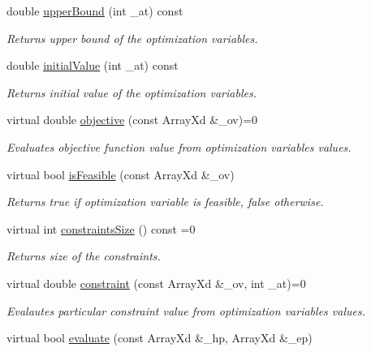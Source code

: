 \begin{DoxyCompactItemize}
double \hyperlink{class_c_optimization_problem_a389f3d72ef773631e96d42b152d2bb2e}{upper\-Bound} (int \-\_\-at) const 
\begin{DoxyCompactList}\small\item\em Returns upper bound of the optimization variables. \end{DoxyCompactList}\item 
double \hyperlink{class_c_optimization_problem_ae1fc23613ecf4730353102bf9132fddb}{initial\-Value} (int \-\_\-at) const 
\begin{DoxyCompactList}\small\item\em Returns initial value of the optimization variables. \end{DoxyCompactList}\item 
virtual double \hyperlink{class_c_optimization_problem_a3e0cc82f344895bd593d1960c4fbadf9}{objective} (const Array\-Xd \&\-\_\-ov)=0
\begin{DoxyCompactList}\small\item\em Evaluates objective function value from optimization variables values. \end{DoxyCompactList}\item 
virtual bool \hyperlink{class_c_optimization_problem_ad3bfb3d51edfeeb18be3ce32731c2ed1}{is\-Feasible} (const Array\-Xd \&\-\_\-ov)
\begin{DoxyCompactList}\small\item\em Returns true if optimization variable is feasible, false otherwise. \end{DoxyCompactList}\item 
virtual int \hyperlink{class_c_optimization_problem_aa4c04d9a7d3885450e9c528f5446c241}{constraints\-Size} () const =0
\begin{DoxyCompactList}\small\item\em Returns size of the constraints. \end{DoxyCompactList}\item 
virtual double \hyperlink{class_c_optimization_problem_ac37dd6a981b9049943189b3fea343f64}{constraint} (const Array\-Xd \&\-\_\-ov, int \-\_\-at)=0
\begin{DoxyCompactList}\small\item\em Evalautes particular constraint value from optimization variables values. \end{DoxyCompactList}\item 
virtual bool \hyperlink{class_c_optimization_problem_a6edffc27d4d909c9572a95d7ea6c7c8b}{evaluate} (const Array\-Xd \&\-\_\-hp, Array\-Xd \&\-\_\-ep)

\end{DoxyCompactItemize}
